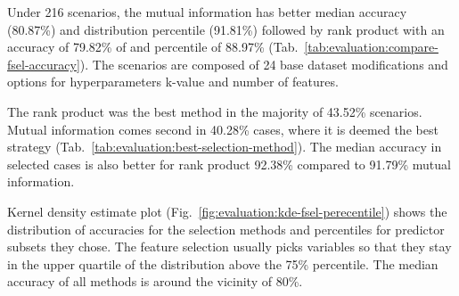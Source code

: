 Under 216 scenarios, the mutual information has better median accuracy (80.87\%) and distribution percentile (91.81\%) followed by rank product with an accuracy of 79.82\% of and percentile of 88.97\% (Tab.~\ref{tab:evaluation:compare-fsel-accuracy}). The scenarios are composed of 24 base dataset modifications and options for hyperparameters k-value and number of features. 

The rank product was the best method in the majority of 43.52\% scenarios. Mutual information comes second in 40.28\% cases, where it is deemed the best strategy (Tab.~\ref{tab:evaluation:best-selection-method}). The median accuracy in selected cases is also better for rank product 92.38\% compared to 91.79\% mutual information. 

Kernel density estimate plot (Fig.~\ref{fig:evaluation:kde-fsel-perecentile}) shows the distribution of accuracies for the selection methods and percentiles for predictor subsets they chose. The feature selection usually picks variables so that they stay in the upper quartile of the distribution above the 75\% percentile. The median accuracy of all methods is around the vicinity of 80\%.


